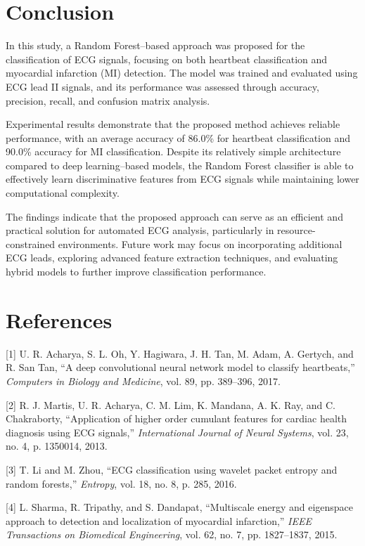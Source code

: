 \documentclass[conference]{IEEEtran}
\begin{document}
\section{Conclusion}
In this study, a Random Forest–based approach was proposed for the classification of ECG signals, focusing on both heartbeat classification and myocardial infarction (MI) detection. The model was trained and evaluated using ECG lead II signals, and its performance was assessed through accuracy, precision, recall, and confusion matrix analysis.

Experimental results demonstrate that the proposed method achieves reliable performance, with an average accuracy of 86.0\% for heartbeat classification and 90.0\% accuracy for MI classification. Despite its relatively simple architecture compared to deep learning–based models, the Random Forest classifier is able to effectively learn discriminative features from ECG signals while maintaining lower computational complexity.

The findings indicate that the proposed approach can serve as an efficient and practical solution for automated ECG analysis, particularly in resource-constrained environments. Future work may focus on incorporating additional ECG leads, exploring advanced feature extraction techniques, and evaluating hybrid models to further improve classification performance.

\section{References}
[1] U. R. Acharya, S. L. Oh, Y. Hagiwara, J. H. Tan, M. Adam, A. Gertych, and R. San Tan, “A deep convolutional neural network model to classify heartbeats,” \textit{Computers in Biology and Medicine}, vol. 89, pp. 389--396, 2017.

[2] R. J. Martis, U. R. Acharya, C. M. Lim, K. Mandana, A. K. Ray, and C. Chakraborty, “Application of higher order cumulant features for cardiac health diagnosis using ECG signals,” \textit{International Journal of Neural Systems}, vol. 23, no. 4, p. 1350014, 2013.

[3] T. Li and M. Zhou, “ECG classification using wavelet packet entropy and random forests,” \textit{Entropy}, vol. 18, no. 8, p. 285, 2016.

[4] L. Sharma, R. Tripathy, and S. Dandapat, “Multiscale energy and eigenspace approach to detection and localization of myocardial infarction,” \textit{IEEE Transactions on Biomedical Engineering}, vol. 62, no. 7, pp. 1827--1837, 2015.
\end{document}
